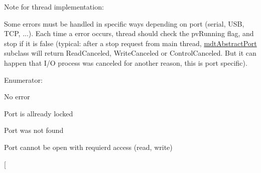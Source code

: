 Note for thread implementation:\par
 Some errors must be handled in specific ways depending on port (serial, USB, TCP, ...). Each time a error occurs, thread should check the pvRunning flag, and stop if it is false (typical: after a stop request from main thread, \hyperlink{classmdt_abstract_port}{mdtAbstractPort} subclass will return ReadCanceled, WriteCanceled or ControlCanceled. But it can happen that I/O process was canceled for another reason, this is port specific). \begin{Desc}
\item[Enumerator: ]\par
\begin{description}
\item[{\em 
\hypertarget{classmdt_abstract_port_ad4121bb930c95887e77f8bafa065a85eab898bd273effe5cb4ed1a399a2d4baad}{
NoError}
\label{classmdt_abstract_port_ad4121bb930c95887e77f8bafa065a85eab898bd273effe5cb4ed1a399a2d4baad}
}]No error \item[{\em 
\hypertarget{classmdt_abstract_port_ad4121bb930c95887e77f8bafa065a85eaedd63daf0db75794bb8e8e467da9575c}{
PortLocked}
\label{classmdt_abstract_port_ad4121bb930c95887e77f8bafa065a85eaedd63daf0db75794bb8e8e467da9575c}
}]Port is allready locked \item[{\em 
\hypertarget{classmdt_abstract_port_ad4121bb930c95887e77f8bafa065a85ea54a896ba3ff98896390e87bfe1f29eb0}{
PortNotFound}
\label{classmdt_abstract_port_ad4121bb930c95887e77f8bafa065a85ea54a896ba3ff98896390e87bfe1f29eb0}
}]Port was not found \item[{\em 
\hypertarget{classmdt_abstract_port_ad4121bb930c95887e77f8bafa065a85eaee5a84e59e9dc5fcf27cac57068bb1f4}{
PortAccess}
\label{classmdt_abstract_port_ad4121bb930c95887e77f8bafa065a85eaee5a84e59e9dc5fcf27cac57068bb1f4}
}]Port cannot be open with requierd access (read, write) \item[{\em 
}
\end{description}
\end{Desc}
